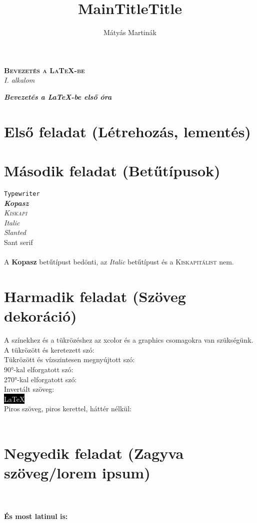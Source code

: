 \documentclass{book}
\begin{document}
	\begin{titlepage}
		\begin{center}
			\title{MainTitle}{\textbf{\Huge{\textsc{Bevezetés a \LaTeX-be}}}}\\
					\huge{\textit{I. alkalom}}
		\end{center}
	\end{titlepage}
\title{Title}\textbf{\huge{\textit{Bevezetés a \LaTeX-be első óra}}}
\author{Mátyás Martinák}
\section{Első feladat (Létrehozás, lementés)}
\section{Második feladat (Betűtípusok)}
	\texttt{Typewriter}\\
	\emph{\textbf{Kopasz}}\\
	\emph{\textsc{Kiskapi}}\\
	\emph{\textit{Italic}}\\
	\textsl{Slanted}\\
	\textsf{Sant serif}\\\\
	A \textbf{Kopasz} betűtípust bedönti, az \textit{Italic} betűtípust és a \textsc{Kiskapitálist} nem.
\section{Harmadik feladat (Szöveg dekoráció)}
	A színekhez és a tükrözéshez az xcolor és a graphics csomagokra van szükségünk.\\
	A tükrözött és keretezett szó: \\
	Tükrözött és vízszintesen megnyújtott szó: \scalebox{2.0}{\scalebox{-1}[1]{\hulipsum[1]}}\\
	90°-kal elforgatott szó: \\
	270°-kal elforgatott szó: \\
	Invertált szöveg:\\
	\colorbox{black}{\textcolor{white}{\LaTeX}}\\
	Piros szöveg, piros kerettel, háttér nélkül:\\
	\\
\clearpage
\section{Negyedik feladat (Zagyva szöveg/lorem ipsum)}
	\hulipsum[1]\\\\
	\textbf{És most latinul is:}\\
	\begin{flushright}
		\begin{otherlanguage}{latin}
			\lipsum[1]
		\end{otherlanguage}
	\end{flushright}
	\linespread{2}
\end{document}
